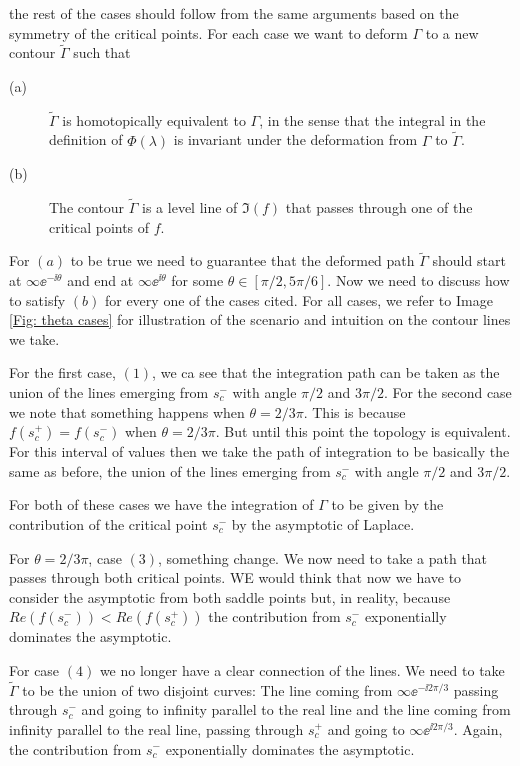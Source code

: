 the rest of the cases should follow from the same arguments based on the symmetry of the critical points. For each case we want to deform $\Gamma$ to a new contour $\tilde{\Gamma}$ such that
\begin{description}
	\item[(a)] $\tilde{\Gamma}$ is homotopically equivalent to $\Gamma$, in the sense that the integral in the definition of $\Phi(\lambda)$ is invariant under the deformation from $\Gamma$ to $\tilde{\Gamma}$.
	\item[(b)] The contour $\tilde{\Gamma}$ is a level line of $\Im{(f)}$ that passes through one of the critical points of $f$.
\end{description}

For $(a)$ to be true we need to guarantee that the deformed path $\tilde{\Gamma}$ should start at $\infty \ee^{-\ii \theta}$ and end at $\infty \ee^{\ii \theta}$ for some $\theta \in [\pi/2, 5\pi/6]$. Now we need to discuss how to satisfy $(b)$ for every one of the cases cited. For all cases, we refer to Image \ref{Fig: theta cases} for illustration of the scenario and intuition on the contour lines we take.

For the first case, $(1)$, we  ca see that the integration path can be taken as the union of the lines emerging from $s_c^-$ with angle $\pi/2$ and $3\pi/2$. For the second case we note that something happens when $\theta = 2/3 \pi$. This is because $f(s_c^+) = f(s_c^-)$ when $\theta = 2/3 \pi$. But until this point the topology is equivalent. For this interval of values then we take the path of integration to be basically the same as before, the union of the lines emerging from $s_c^-$ with angle $\pi/2$ and $3\pi/2$.

For both of these cases we have the integration of $\Gamma$ to be given by the contribution of the critical point $s_c^-$ by the asymptotic of Laplace.

For $\theta = 2/3 \pi$, case $(3)$, something change. We now need to take a path that passes through both critical points. WE would think that now we have to consider the asymptotic from both saddle points but, in reality, because $Re(f(s_c^-)) < Re(f(s_c^+))$ the contribution from $s_c^-$ exponentially dominates the asymptotic.

For case $(4)$ we no longer have a clear connection of the lines. We need to take $\tilde{\Gamma}$ to be the union of two disjoint curves: The line coming from $\infty \ee^{-\ii 2\pi/3}$ passing through $s_c^-$ and going to infinity parallel to the real line and the line coming from infinity parallel to the real line, passing through $s_c^+$ and going to $\infty \ee^{\ii 2\pi/3}$. Again,  the contribution from $s_c^-$ exponentially dominates the asymptotic.

